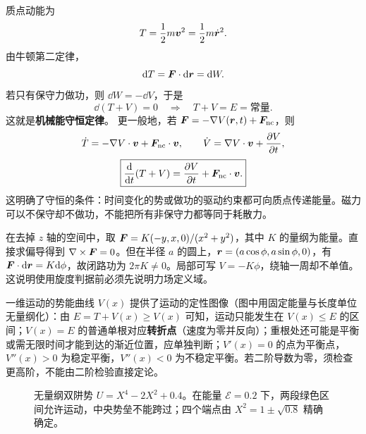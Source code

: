 质点动能为
\begin{equation}
T=\frac12m\boldsymbol{v}^2=\frac12m\dot{\boldsymbol{r}}^2.
\end{equation}
由牛顿第二定律，
\begin{equation}
\mathrm{d} T=\boldsymbol{F}\cdot\mathrm{d}\boldsymbol{r}=\mathrm{d} W .
\end{equation}
若只有保守力做功，则 $\dd W=-\dd V$，于是
\begin{equation}
\dd(T+V)=0\quad\Longrightarrow\quad T+V=E=\text{常量}.
\label{eq:energy-conservation}
\end{equation}
这就是\textbf{机械能守恒定律}。
更一般地，若 $\boldsymbol{F}=-\nabla V(\boldsymbol{r},t)+\boldsymbol{F}_{\rm nc}$，则
\[
\dot T=-\nabla V\cdot\boldsymbol{v}+\boldsymbol{F}_{\rm nc}\cdot\boldsymbol{v},\qquad
\dot V=\nabla V\cdot\boldsymbol{v}+\frac{\partial V}{\partial t},
\]
\begin{equation}\label{eq:ch1-energy-general}
\boxed{\frac{\mathrm{d}}{\mathrm{d} t}(T+V)=\frac{\partial V}{\partial t}+\boldsymbol{F}_{\rm nc}\cdot\boldsymbol{v}.}
\end{equation}
这明确了守恒的条件：时间变化的势或做功的驱动约束都可向质点传递能量。磁力可以不保守却不做功，不能把所有非保守力都等同于耗散力。
\begin{example}[无旋不一定全局保守]
在去掉 $z$ 轴的空间中，取 $\boldsymbol{F}=K(-y,x,0)/(x^2+y^2)$，其中 $K$ 的量纲为能量。直接求偏导得到 $\nabla\times\boldsymbol{F}=0$。但在半径 $a$ 的圆上，$\boldsymbol{r}=(a\cos\phi,a\sin\phi,0)$，有 $\boldsymbol{F}\cdot\mathrm{d}\boldsymbol{r}=K\mathrm{d}\phi$，故闭路功为 $2\pi K\ne0$。局部可写 $V=-K\phi$，绕轴一周却不单值。这说明使用旋度判据前必须先说明力场定义域。
\end{example}

一维运动的势能曲线 $V(x)$ 提供了运动的定性图像（图中用固定能量与长度单位无量纲化）：由 $E=T+V(x)\ge V(x)$ 可知，运动只能发生在 $V(x)\le E$ 的区间；$V(x)=E$ 的普通单根对应\textbf{转折点}（速度为零并反向）；重根处还可能是平衡或需无限时间才能到达的渐近位置，应单独判断；$V'(x)=0$ 的点为平衡点，$V''(x)>0$ 为稳定平衡，$V''(x)<0$ 为不稳定平衡。若二阶导数为零，须检查更高阶，不能由二阶检验直接定论。

\begin{figure}[htbp]
\centering
{}
\caption{无量纲双阱势 $U=X^4-2X^2+0.4$。在能量 $\mathcal E=0.2$ 下，两段绿色区间允许运动，中央势垒不能跨过；四个端点由 $X^2=1\pm\sqrt{0.8}$ 精确确定。}
\label{fig:potential-curve}
\end{figure}

